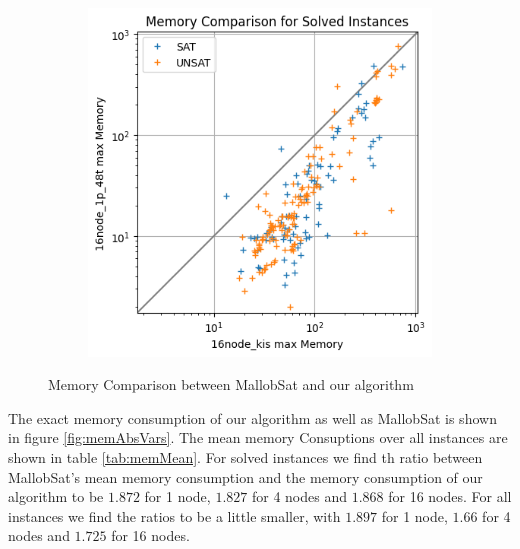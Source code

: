 \documentclass[12pt,a4paper,twoside]{scrartcl}
\numberwithin{equation}{section}
\begin{document}
\begin{figure}
\begin{subfigure}[c]{.4\textwidth}
    \label{fig:memCompare4node}
  \end{subfigure}
  \begin{subfigure}[c]{.4\textwidth}
    \center
    \includegraphics[scale=.5]{plots/square_mem_compare/square_mem_16node.png}
    \label{fig:memCompare16node}
  \end{subfigure}
  \caption{Memory Comparison between MallobSat and our algorithm}
  \label{fig:memCompare}
\end{figure}

The exact memory consumption of our algorithm as well as MallobSat is shown in figure \ref{fig:memAbsVars}. The mean memory Consuptions over all instances are shown in table \ref{tab:memMean}. For solved instances we find th ratio between MallobSat's mean memory consumption and the memory consumption of our algorithm to be $1.872$ for 1 node, $1.827$ for 4 nodes and $1.868$ for 16 nodes. For all instances we find the ratios to be a little smaller, with $1.897$ for 1 node, $1.66$ for 4 nodes and $1.725$ for 16 nodes.
\end{document}
